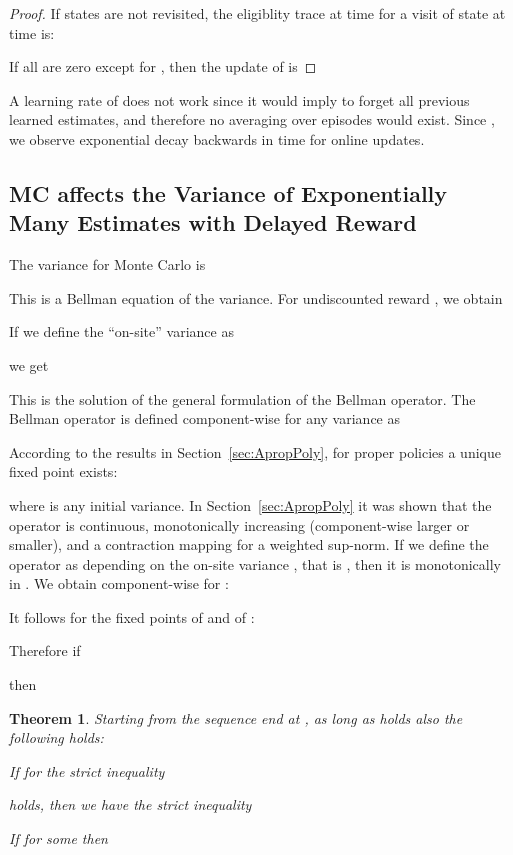 \documentclass{article}
\newtheorem{theoremA}{Theorem}
\begin{document}
\begin{appendices}
\begin{proof}
If states are not revisited,
the eligiblity trace at time  for a visit of state  at time  is:
 
If all  are zero except for ,
then the update of  is
 
\end{proof}

A learning rate of  does not work since it would imply to
forget all previous learned estimates, and therefore no averaging over
episodes would exist.
Since , we observe exponential decay backwards in time for online updates. 


\subsection{MC affects the Variance of Exponentially Many Estimates
  with Delayed Reward }
  \label{sec:AMCvariance}


The variance for Monte Carlo is

This is a Bellman equation of the variance. For undiscounted reward , we obtain


If we define the ``on-site'' variance  as

we get

This is the solution of the
general formulation of the
Bellman operator. The Bellman operator
is defined component-wise for any variance  as

According to the results in Section~\ref{sec:ApropPoly},
for proper policies  a unique fixed point  exists:

where  is any initial variance.
In Section~\ref{sec:ApropPoly} it was shown that
the operator  is
continuous, monotonically increasing (component-wise larger or smaller),
and a contraction mapping for
a weighted sup-norm. If we define the operator  as depending on the on-site
variance , that is
 , then it is monotonically in . 
We obtain component-wise for :


It follows for the fixed points  of  and
 of : 

Therefore if 

then 




\begin{theoremA}
Starting from the sequence end at ,
as long as  holds also
the following holds:

If for  the strict inequality
 
holds, then we have the strict inequality

If  for some   then


\end{theoremA}
\end{appendices}
\end{document}
